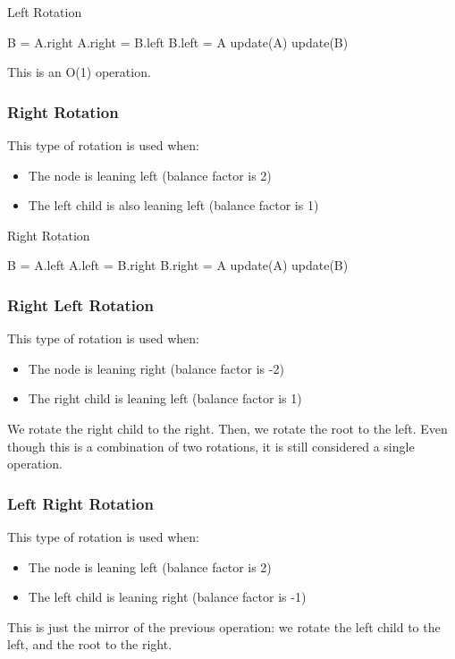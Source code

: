 \documentclass[a4paper]{article}
\begin{document}
\begin{algorithm}[H]
	\caption{Left Rotation}
	B = A.right\;
	A.right = B.left\;
	B.left = A\;
	update(A)\;
	update(B)\;
\end{algorithm}

\begin{note}
This is an O(1) operation.
\end{note}

\subsubsection{Right Rotation}
This type of rotation is used when:
\begin{itemize}
	\item The node is leaning left (balance factor is 2)
		\item The left child is also leaning left (balance factor is 1)
\end{itemize}

\begin{algorithm}[H]
	\caption{Right Rotation}
	B = A.left\;
	A.left = B.right\;
	B.right = A\;
	update(A)\;
	update(B)\;
\end{algorithm}


\subsubsection{Right Left Rotation}
This type of rotation is used when:
\begin{itemize}
	\item The node is leaning right (balance factor is -2)
	\item The right child is leaning left (balance factor is 1)
\end{itemize}
We rotate the right child to the right. Then, we rotate the root to the left. Even though this is a combination of two rotations, it is still considered a single operation.

\subsubsection{Left Right Rotation}
This type of rotation is used when:
\begin{itemize}
	\item The node is leaning left (balance factor is 2)
	\item The left child is leaning right (balance factor is -1)
\end{itemize}
This is just the mirror of the previous operation: we rotate the left child to the left, and the root to the right.
\end{document}
